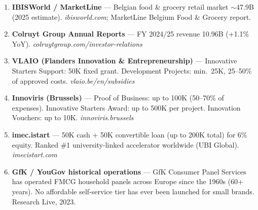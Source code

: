 \documentclass[11pt,a4paper]{article}
\begin{document}
\begin{enumerate}[leftmargin=1.5em, itemsep=2pt, font=\small]
  \item[\textbf{[17]}] \textbf{IBISWorld / MarketLine} --- Belgian food \& grocery retail market $\sim$\texteuro{}47.9B (2025 estimate). \textit{ibisworld.com}; MarketLine Belgium Food \& Grocery report.
  \item[\textbf{[18]}] \textbf{Colruyt Group Annual Reports} --- FY 2024/25 revenue \texteuro{}10.96B (+1.1\% YoY). \textit{colruytgroup.com/investor-relations}
  \item[\textbf{[19]}] \textbf{VLAIO (Flanders Innovation \& Entrepreneurship)} --- Innovative Starters Support: \texteuro{}50K fixed grant. Development Projects: min.\ \texteuro{}25K, 25--50\% of approved costs. \textit{vlaio.be/en/subsidies}
  \item[\textbf{[20]}] \textbf{Innoviris (Brussels)} --- Proof of Business: up to \texteuro{}100K (50--70\% of expenses). Innovative Starters Award: up to \texteuro{}500K per project. Innovation Vouchers: up to \texteuro{}10K. \textit{innoviris.brussels}
  \item[\textbf{[21]}] \textbf{imec.istart} --- \texteuro{}50K cash + \texteuro{}50K convertible loan (up to \texteuro{}200K total) for 6\% equity. Ranked \#1 university-linked accelerator worldwide (UBI Global). \textit{imecistart.com}
  \item[\textbf{[22]}] \textbf{GfK / YouGov historical operations} --- GfK Consumer Panel Services has operated FMCG household panels across Europe since the 1960s (60+ years). No affordable self-service tier has ever been launched for small brands. Research Live, 2023.
\end{enumerate}

\clearpage

\thispagestyle{empty}
\end{document}
